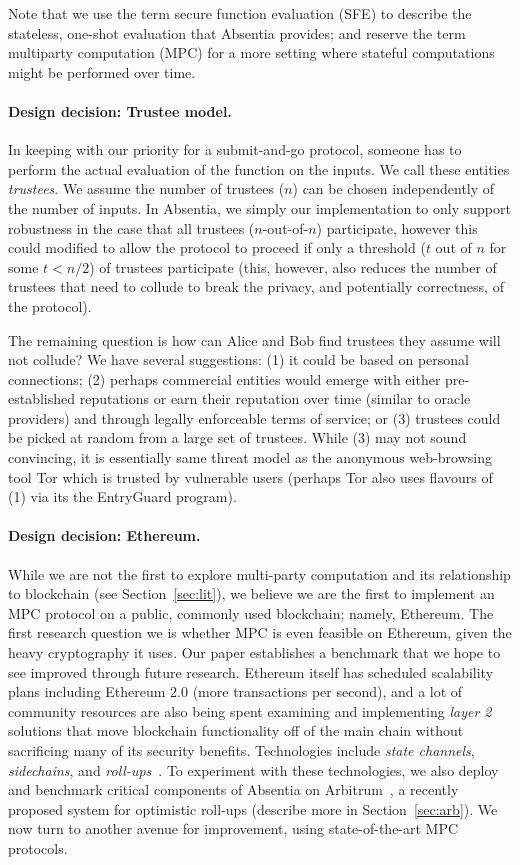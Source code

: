 Note that we use the term secure function evaluation (SFE) to describe the stateless, one-shot evaluation that Absentia provides; and reserve the term multiparty computation (MPC) for a more setting where stateful computations might be performed over time.

\paragraph{Design decision: Trustee model.} In keeping with our priority for a submit-and-go protocol, someone has to perform the actual evaluation of the function on the inputs. We call these entities \emph{trustees}. We assume the number of trustees ($n$) can be chosen independently of the number of inputs. In Absentia, we simply our implementation to only support robustness in the case that all trustees ($n$-out-of-$n$) participate, however this could modified to allow the protocol to proceed if only a threshold ($t$ out of $n$ for some $t<n/2$) of trustees participate (this, however, also reduces the number of trustees that need to collude to break the privacy, and potentially correctness, of the protocol).  

The remaining question is how can Alice and Bob find trustees they assume will not collude? We have several suggestions: (1) it could be based on personal connections; (2) perhaps commercial entities would emerge with either pre-established reputations or earn their reputation over time (similar to oracle providers) and through legally enforceable terms of service; or (3) trustees could be picked at random from a large set of trustees. While (3) may not sound convincing, it is essentially same threat model as the anonymous web-browsing tool Tor which is trusted by vulnerable users (perhaps Tor also uses flavours of (1) via its the EntryGuard program). 

\paragraph{Design decision: Ethereum.} While we are not the first to explore multi-party computation and its relationship to blockchain (see Section~\ref{sec:lit}), we believe we are the first to implement an MPC protocol on a public, commonly used blockchain; namely, Ethereum. The first research question we is whether MPC is even feasible on Ethereum, given the heavy cryptography it uses. Our paper establishes a benchmark that we hope to see improved through future research. Ethereum itself has scheduled scalability plans including Ethereum 2.0 (more transactions per second), and a lot of community resources are also being spent examining and implementing \emph{layer 2} solutions that move blockchain functionality off of the main chain without sacrificing many of its security benefits. Technologies include \emph{state channels}, \emph{sidechains}, and \emph{roll-ups}~\cite{GMR+20}. To experiment with these technologies, we also deploy and benchmark critical components of Absentia on Arbitrum~\cite{KGCWF18}, a recently proposed system for optimistic roll-ups (describe more in Section~\ref{sec:arb}). We now turn to another avenue for improvement, using state-of-the-art MPC protocols.

